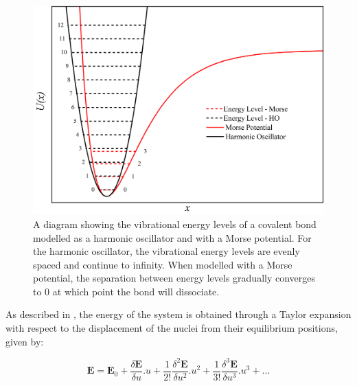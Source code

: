 \begin{figure}[t]
    \centering
    \includegraphics[scale=0.6]{Figures/Misc/Theory/MorsePotential.png}
    \captionsetup{font = footnotesize, justification = centering}
    \caption[The Harmonic Oscillator and Morse Potential]{A diagram showing the vibrational energy levels of a covalent bond modelled as a harmonic oscillator and with a Morse potential. For the harmonic oscillator, the vibrational energy levels are evenly spaced and continue to infinity. When modelled with a Morse potential, the separation between energy levels gradually converges to 0 at which point the bond will dissociate.}
    \label{fig:SHO_morse}
\end{figure}

As described in , the energy of the system is obtained through a Taylor expansion with respect to the displacement of the nuclei from their equilibrium positions, given by:

\begin{equation}
\boldsymbol{E} = \boldsymbol{E}_0 + \frac{\delta \boldsymbol{E}}{\delta u}.u + \frac{1}{2!} \frac{\delta^2 \boldsymbol{E}}{\delta u^2}.u^2 + \frac{1}{3!} \frac{\delta^3 \boldsymbol{E}}{\delta u^3}.u^3 + ...
\label{eqn:ETaylor2}
\end{equation}

